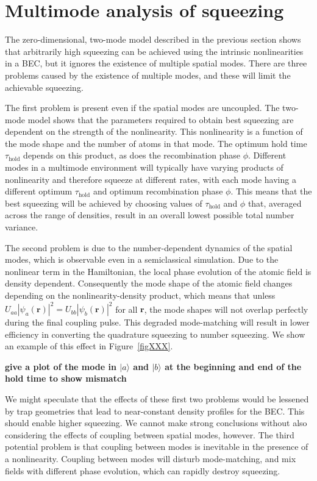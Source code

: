\documentclass{iopart}
\begin{document}
\section{Multimode analysis of squeezing}

The zero-dimensional, two-mode model described in the previous section shows that arbitrarily high squeezing can be achieved using the intrinsic nonlinearities in a BEC, but it ignores the existence of multiple spatial modes.  There are three problems caused by the existence of multiple modes, and these will limit the achievable squeezing.

The first problem is present even if the spatial modes are uncoupled.  The two-mode model shows that the parameters required to obtain best squeezing are dependent on the strength of the nonlinearity.  This nonlinearity is a function of the mode shape and the number of atoms in that mode.  The optimum hold time $\tau_{\mathrm{hold}}$ depends on this product, as does the recombination phase $\phi$.  Different modes in a multimode environment will typically have varying products of nonlinearity and therefore squeeze at different rates, with each mode having a different optimum $\tau_{\mathrm{hold}}$ and optimum recombination phase $\phi$.  This means that the best squeezing will be achieved by choosing values of $\tau_{\mathrm{hold}}$ and $\phi$ that, averaged across the range of densities, result in an overall lowest possible total number variance.  

The second problem is due to the number-dependent dynamics of the spatial modes, which is observable even in a semiclassical simulation.  Due to the nonlinear term in the Hamiltonian, the local phase evolution of the atomic field is density dependent.  Consequently the mode shape of the atomic field changes depending on the nonlinearity-density product, which means that unless $U_{aa}|\psi_a({\mathbf{r}})|^2 = U_{bb}|\psi_b({\mathbf{r}})|^2$ for all ${\mathbf{r}}$, the mode shapes will not overlap perfectly during the final coupling pulse. This degraded mode-matching will result in lower efficiency in converting the quadrature squeezing to number squeezing. We show an example of this effect in Figure~\ref{figXXX}.

\textbf{give a plot of the mode in $|a\rangle$ and $|b\rangle$ at the beginning and end of the hold time to show mismatch}

We might speculate that the effects of these first two problems would be lessened by trap geometries that lead to near-constant density profiles for the BEC.  This should enable higher squeezing.  We cannot make strong conclusions without also considering the effects of coupling between spatial modes, however.  The third potential problem is that coupling between modes is inevitable in the presence of a nonlinearity.  Coupling between modes will disturb mode-matching, and mix fields with different phase evolution, which can rapidly destroy squeezing.  
\end{document}
